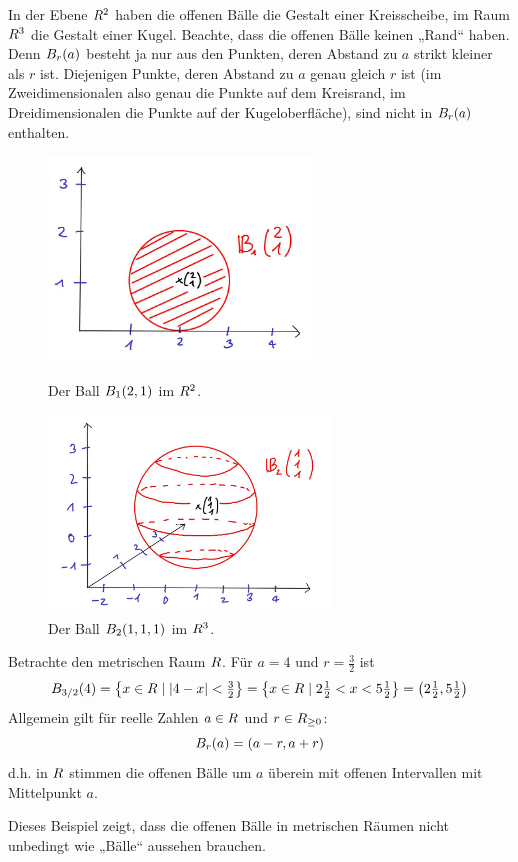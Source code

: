 \begin{bsp}
    In der Ebene $\relax R^2$ haben die offenen Bälle die Gestalt einer Kreisscheibe, im Raum $\relax R^3$ die Gestalt einer Kugel. Beachte, dass die offenen Bälle keinen „Rand“ haben. Denn $\relax B_r(a)$ besteht ja nur aus den Punkten, deren Abstand zu $a$ strikt kleiner als $r$ ist. Diejenigen Punkte, deren Abstand zu $a$ genau gleich $r$ ist (im Zweidimensionalen also genau die Punkte auf dem Kreisrand, im Dreidimensionalen die Punkte auf der Kugeloberfläche), sind nicht in $\relax B_r(a)$ enthalten.
    \begin{figure}[ht]
        \begin{minipage}{.48\textwidth}
            \includegraphics[width=7cm]{./_img/2Dball.jpeg}
            \centering \caption{Der Ball $\relax B_1(2,1)$ im $\relax R^2$.}
        \end{minipage}
        \quad
        \begin{minipage}{.48\textwidth}
            \includegraphics[width=7.5cm]{./_img/3Dball.jpeg}
            \centering \caption{Der Ball $\relax B_2(1,1,1)$ im $\relax R^3$.}
        \end{minipage}
    \end{figure}
\end{bsp}


\begin{bsp} \label{intervallbaelle}
    Betrachte den metrischen Raum $\relax R$. Für $a=4$ und $r= \frac{3}{2}$ ist
        \[ \relax B_{3/2}(4) = \left\{ x\in \relax R\mid \vert 4-x\vert <\tfrac{3}{2} \right\} = \left\{ x\in \relax R\mid 2\tfrac{1}{2}<x<5\tfrac{1}{2} \right\} = \left(2\tfrac{1}{2},5\tfrac{1}{2}\right) \]
    Allgemein gilt für reelle Zahlen $a\in \relax R$ und $r\in \relax R_{\ge 0}$:
        \[ \relax B_r(a) = (a-r,a+r) \]
    d.h. in $\relax R$ stimmen die offenen Bälle um $a$ überein mit offenen Intervallen mit Mittelpunkt $a$.

    Dieses Beispiel zeigt, dass die offenen Bälle in metrischen Räumen nicht unbedingt wie „Bälle“ aussehen brauchen.
\end{bsp}


